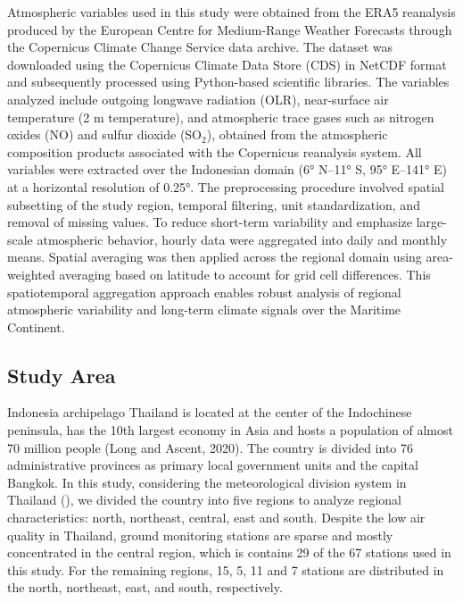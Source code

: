\documentclass[pdflatex,sn-mathphys-num]{sn-jnl}%
\theoremstyle{thmstyleone}%
\theoremstyle{thmstyletwo}%
\theoremstyle{thmstylethree}%
\begin{document}
Atmospheric variables used in this study were obtained from the ERA5 reanalysis produced by the European Centre for Medium-Range Weather Forecasts through the Copernicus Climate Change Service data archive. The dataset was downloaded using the Copernicus Climate Data Store (CDS) in NetCDF format and subsequently processed using Python-based scientific libraries. The variables analyzed include outgoing longwave radiation (OLR), near-surface air temperature (2 m temperature), and atmospheric trace gases such as nitrogen oxides (NO) and sulfur dioxide (SO$_2$), obtained from the atmospheric composition products associated with the Copernicus reanalysis system. All variables were extracted over the Indonesian domain (6° N–11° S, 95° E–141° E) at a horizontal resolution of 0.25°. The preprocessing procedure involved spatial subsetting of the study region, temporal filtering, unit standardization, and removal of missing values. To reduce short-term variability and emphasize large-scale atmospheric behavior, hourly data were aggregated into daily and monthly means. Spatial averaging was then applied across the regional domain using area-weighted averaging based on latitude to account for grid cell differences. This spatiotemporal aggregation approach enables robust analysis of regional atmospheric variability and long-term climate signals over the Maritime Continent.



\subsection{Study Area}
Indonesia archipelago
Thailand is located at the center of the Indochinese peninsula, has the 10th largest economy in Asia and hosts a population of almost 70 million people (Long and Ascent, 2020). The country is divided into 76 administrative provinces as primary local government units and the capital Bangkok. In this study, considering the meteorological division system in Thailand (), we divided the country into five regions to analyze regional characteristics: north, northeast, central, east and south. Despite the low air quality in Thailand, ground monitoring stations are sparse and mostly concentrated in the central region, which is contains 29 of the 67 stations used in this study. For the remaining regions, 15, 5, 11 and 7 stations are distributed in the north, northeast, east, and south, respectively.
\end{document}
